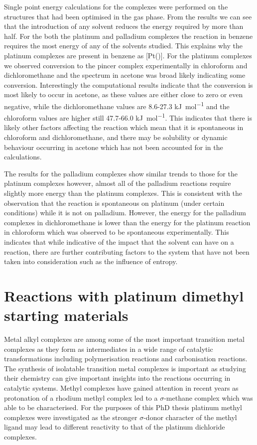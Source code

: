 Single point energy calculations for the complexes were performed on the structures that had been optimised in the gas phase.  From the results we can see that the introduction of any solvent reduces the energy required by more than half.  For the both the platinum and palladium complexes the reaction in benzene requires the most energy of any of the solvents studied.  This explains why the platinum complexes are present in benzene as [Pt(\tBuxantphos)].  For the platinum complexes we observed conversion to the pincer complex experimentally in chloroform and dichloromethane and the spectrum in acetone was broad likely indicating some conversion.  Interestingly the computational results indicate that the conversion is most likely to occur in acetone, as these values are either close to zero or even negative, while the dichloromethane values are 8.6-27.3 \si{\kilo\joule\per\mole} and the chloroform values are higher still 47.7-66.0 \si{\kilo\joule\per\mole}.  This indicates that there is likely other factors affecting the reaction which mean that it is spontaneous in chloroform and dichloromethane, and there may be solubility or dynamic behaviour occurring in acetone which has not been accounted for in the calculations.  

The results for the palladium complexes show similar trends to those for the platinum complexes however, almost all of the palladium reactions require slightly more energy than the platinum complexes.  This is consistent with the observation that the reaction is spontaneous on platinum (under certain conditions) while it is not on palladium.  However, the energy for the palladium complexes in dichloromethane is lower than the energy for the platinum reaction in chloroform which was observed to be spontaneous experimentally.  This indicates that while indicative of the impact that the solvent can have on a reaction, there are further contributing factors to the system that have not been taken into consideration such as the influence of entropy.  



\section{Reactions with platinum dimethyl starting materials}

Metal alkyl complexes are among some of the most important transition metal complexes as they form as intermediates in a wide range of catalytic transformations including polymerisation reactions and carbonisation reactions.\cite{Moss1996}  The synthesis of isolatable transition metal complexes is important as studying their chemistry can give important insights into the reactions occurring in catalytic systems.  Methyl complexes have gained attention in recent years as protonation of a rhodium methyl complex led to a $\sigma$-methane complex which was able to be characterised.\cite{Bernskoetter2009}  For the purposes of this PhD thesis platinum methyl complexes were investigated as the stronger $\sigma$-donor character of the methyl ligand may lead to different reactivity to that of the platinum dichloride complexes. 

